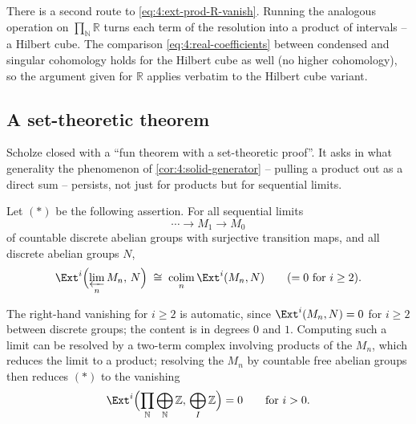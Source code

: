 \begin{remark}
\label{rmk:4:hilbert-cube}
There is a second route to \eqref{eq:4:ext-prod-R-vanish}. Running the analogous
operation on $\prod_{\mathbb{N}}\mathbb{R}$ turns each term of the resolution into
a product of intervals -- a Hilbert cube. The comparison
\eqref{eq:4:real-coefficients} between condensed and singular cohomology holds
for the Hilbert cube as well (no higher cohomology), so the argument given for
$\mathbb{R}$ applies verbatim to the Hilbert cube variant.
\end{remark}

\subsection{A set-theoretic theorem}

Scholze closed with a ``fun theorem with a set-theoretic proof''. It asks in what
generality the phenomenon of \cref{cor:4:solid-generator} -- pulling a product
out as a direct sum -- persists, not just for products but for sequential
limits.

\begin{definition}
\label{def:4:star}
Let $(\ast)$ be the following assertion. For all sequential limits
\begin{equation*}
\cdots\to M_1\to M_0
\end{equation*}
of countable discrete abelian groups with surjective transition maps, and all
discrete abelian groups $N$,
\begin{equation*}
\Ext^{i}\Bigl(\varprojlim_{n}M_n,\,N\Bigr)\;\cong\;
\operatorname*{colim}_{n}\Ext^{i}(M_n,N)\qquad(=0\ \text{for }i\geq2).
\end{equation*}
\end{definition}

The right-hand vanishing for $i\geq2$ is automatic, since $\Ext^i(M_n,N)=0$ for
$i\geq2$ between discrete groups; the content is in degrees $0$ and $1$.
Computing such a limit can be resolved by a two-term complex involving products
of the $M_n$, which reduces the limit to a product; resolving the $M_n$ by
countable free abelian groups then reduces $(\ast)$ to the vanishing
\begin{equation*}
\Ext^{i}\Bigl(\prod_{\mathbb{N}}\bigoplus_{\mathbb{N}}\mathbb{Z},\,
\bigoplus_{I}\mathbb{Z}\Bigr)=0\qquad\text{for }i>0.
\end{equation*}


